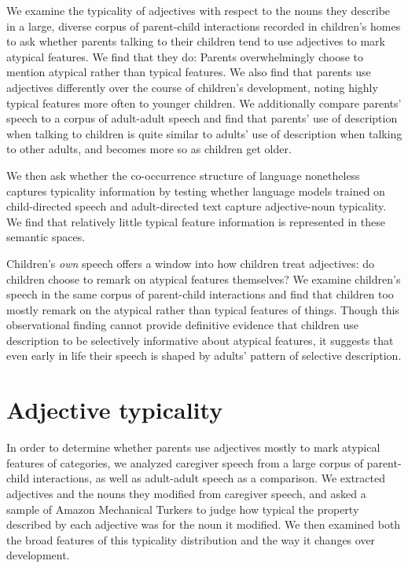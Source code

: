 \documentclass{ucetd}
\begin{document}
We examine the typicality of adjectives with respect to the nouns they
describe in a large, diverse corpus of parent-child interactions
recorded in children's homes to ask whether parents talking to their
children tend to use adjectives to mark atypical features. We find that
they do: Parents overwhelmingly choose to mention atypical rather than
typical features. We also find that parents use adjectives differently
over the course of children's development, noting highly typical
features more often to younger children. We additionally compare
parents' speech to a corpus of adult-adult speech and find that parents'
use of description when talking to children is quite similar to adults'
use of description when talking to other adults, and becomes more so as
children get older.

We then ask whether the co-occurrence structure of language nonetheless
captures typicality information by testing whether language models
trained on child-directed speech and adult-directed text capture
adjective-noun typicality. We find that relatively little typical
feature information is represented in these semantic spaces.

Children's \emph{own} speech offers a window into how children treat
adjectives: do children choose to remark on atypical features
themselves? We examine children's speech in the same corpus of
parent-child interactions and find that children too mostly remark on
the atypical rather than typical features of things. Though this
observational finding cannot provide definitive evidence that children
use description to be selectively informative about atypical features,
it suggests that even early in life their speech is shaped by adults'
pattern of selective description.

\hypertarget{adjective-typicality}{%
\section{Adjective typicality}\label{adjective-typicality}}

In order to determine whether parents use adjectives mostly to mark
atypical features of categories, we analyzed caregiver speech from a
large corpus of parent-child interactions, as well as adult-adult speech
as a comparison. We extracted adjectives and the nouns they modified
from caregiver speech, and asked a sample of Amazon Mechanical Turkers
to judge how typical the property described by each adjective was for
the noun it modified. We then examined both the broad features of this
typicality distribution and the way it changes over development.
\end{document}
